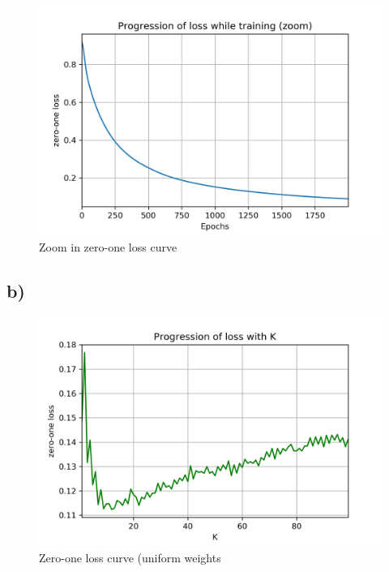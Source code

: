 \documentclass[a4paper]{article}
\begin{document}
\begin{figure}[H]
    \centering
    \includegraphics[width=12cm]{zero_one_loss_zoom}
    \caption{Zoom in zero-one loss curve}
    \label{fig:ex2-a-zero_one_loss_zoom}
\end{figure}

\subsection{b) }

\begin{figure}[H]
    \centering
    \includegraphics[width=12cm]{error_uniform}
    \caption{Zero-one loss curve (uniform weights}
    \label{fig:ex2-b-error_uniform_0}
\end{figure}
\end{document}
